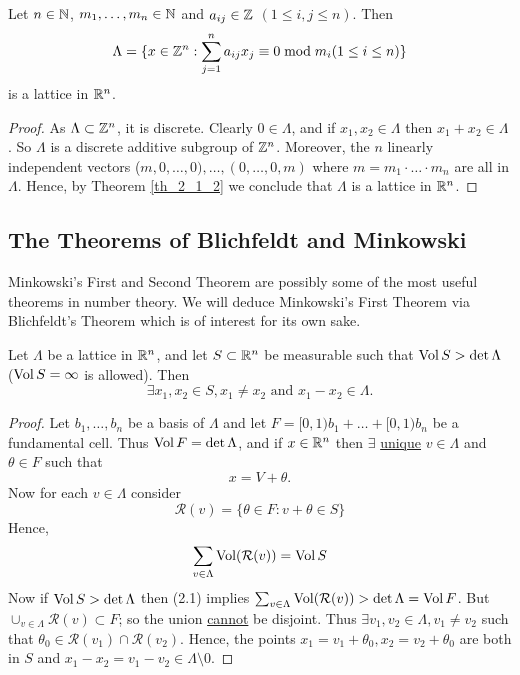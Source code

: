 \documentclass[NumTh.tex]{subfiles}
\begin{document}
\begin{cor}
  Let $n \in \mathbb{N}$, $m_1,\dots,m_n \in \mathbb{N}$ and $a_{ij} \in \mathbb{Z}$ $(1\leq i,j \leq n)$.
  Then 
  \[ \Lambda = \{ x \in \mathbb{Z}^n : \sum_{j=1}^n a_{ij} x_j \equiv 0 \bmod m_i (1 \leq i \leq n) \} \]
  is a lattice in $\mathbb{R}^n$.
\end{cor}

\begin{proof}
  As $\Lambda \subset \mathbb{Z}^n$, it is discrete. Clearly $0 \in \Lambda$, and if $x_1,x_2 \in \Lambda$ then $x_1 + x_2 \in \Lambda$.
  So $\Lambda$ is a discrete additive subgroup of $\mathbb{Z}^n$.
  Moreover, the $n$ linearly independent vectors ($m,0,\dots,0),\dots,(0,\dots,0,m)$ where $m = m_1 \cdot \dots \cdot m_n$
  are all in $\Lambda$.
  Hence, by Theorem \ref{th_2_1_2} we conclude that $\Lambda$ is a lattice in $\mathbb{R}^n$.
\end{proof}


\subsection{The Theorems of Blichfeldt and Minkowski}

Minkowski's First and Second Theorem are possibly some of the most useful theorems in number theory.
We will deduce Minkowski's First Theorem via Blichfeldt's Theorem which is of interest for its own sake.

\begin{theorem}
  Let $\Lambda$ be a lattice in $\mathbb{R}^n$, and let $S \subset \mathbb{R}^n$ be measurable such that $\operatorname{Vol} S > \det \Lambda$ ($\operatorname{Vol} S = \infty$ is allowed).
  Then 
  \[ \exists x_1,x_2 \in S, x_1 \neq x_2 \text{ and } x_1 - x_2 \in \Lambda \text{.}\]
\end{theorem}

\begin{proof}
  Let $b_1,\dots,b_n$ be a basis of $\Lambda$ and let $F = [0,1) b_1 + \dots + [0,1) b_n$ be a fundamental cell.
  Thus $\operatorname{Vol} F = \det \Lambda$, and if $x \in \mathbb{R}^n$ then $\exists$ \underline{unique} $v \in \Lambda$ and $\theta \in F$ such that
  \[ x = V + \theta \text{.}\]
  Now for each $v \in \Lambda$ consider
  \[ \mathcal{R}(v) = \{ \theta \in F : v + \theta \in S \} \]
  Hence, 
  \[ \sum_{v \in \Lambda} \operatorname{Vol}(\mathcal{R}(v)) = \operatorname{Vol} S \]
  Now if $\operatorname{Vol} S > \det \Lambda$ then (2.1) implies $\sum_{v \in \Lambda} \operatorname{Vol} (\mathcal{R}(v)) > \det \Lambda = \operatorname{Vol} F  $.
  But $\cup_{v \in \Lambda} \mathcal{R}(v) \subset F$; so the union \underline{cannot} be disjoint.
  Thus $\exists v_1,v_2 \in \Lambda, v_1 \neq v_2$ such that $\theta_0 \in \mathcal{R}(v_1) \cap \mathcal{R}(v_2)$.
  Hence, the points $x_1 = v_1 + \theta_0, x_2 = v_2 + \theta_0$ are both in $S$ and $x_1 - x_2 = v_1 - v_2 \in \Lambda \setminus 0$.
\end{proof}
\end{document}
